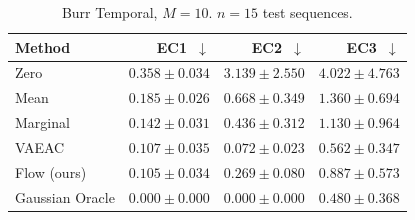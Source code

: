 \documentclass[11pt]{article}
\begin{document}
\begin{table}[h]
\centering
\caption{Burr Temporal, $M=10$. $n=15$ test sequences.}
\label{tab:burr_m10}
\begin{tabular}{lrrr}
\toprule
Method               & EC1~$\downarrow$           & EC2~$\downarrow$           & EC3~$\downarrow$ \\
\midrule
Zero                 & $0.358 \pm 0.034$          & $3.139 \pm 2.550$          & $4.022 \pm 4.763$ \\
Mean                 & $0.185 \pm 0.026$          & $0.668 \pm 0.349$          & $1.360 \pm 0.694$ \\
Marginal             & $0.142 \pm 0.031$          & $0.436 \pm 0.312$          & $1.130 \pm 0.964$ \\
VAEAC                & $0.107 \pm 0.035$          & $\mathbf{0.072 \pm 0.023}$ & $\mathbf{0.562 \pm 0.347}$ \\
Flow (ours)          & $\mathbf{0.105 \pm 0.034}$ & $0.269 \pm 0.080$          & $0.887 \pm 0.573$ \\
\midrule
Gaussian Oracle      & $0.000 \pm 0.000$          & $0.000 \pm 0.000$          & $0.480 \pm 0.368$ \\
\bottomrule
\end{tabular}
\end{table}
\end{document}
